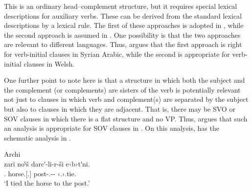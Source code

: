 \documentclass[output=paper]{langsci/langscibook}
\begin{document}
\ea\label{ex:key:4.23}
\z
%
This is an ordinary head--complement structure, but it requires special lexical
descriptions for auxiliary verbs. These can be derived from the standard
lexical descriptions by a lexical rule. The first of these approaches is
adopted in \citet[36]{GinSag2000}, while the second approach is assumed in
\citet[410]{SagWasBen2003}. One possibility is that the two approaches are
relevant to different languages. Thus, \citet{Borsley1995} argues that the
first approach is right for verb-initial clauses in Syrian Arabic, while the
second is appropriate for verb-initial clauses in Welsh.

One further point to note here is that a structure in which both the subject
and the complement (or complements) are sisters of the verb is potentially
relevant not just to clauses in which verb and complement(s) are separated by
the subject but also to clauses in which they are adjacent. That is, there may
be SVO or SOV clauses in which there is a flat structure and no VP. Thus,
\citet{Borsley2016} argues that such an analysis is appropriate for SOV clauses
in . On this analysis,  has the schematic analysis in
.

\ea\label{ex:key:4.24}Archi\\
    \sn
    \gll zari noˤš darcʹ-li-r-ši e‹b›tʹni.\\
            \Fsg.\Erg{} horse.\Iii{}[\Sg.\Abs{}] post-\Obl.\Sg{}-\Cont-\All{} ‹\Iii.\Sg›.tie.\Pfv{}\\
    \glt    \enquote*{I tied the horse to the post.}
\z
\end{document}
